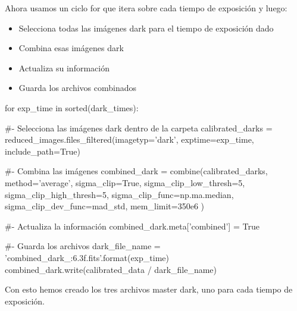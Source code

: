 Ahora usamos un ciclo for que itera sobre cada tiempo de exposición y luego:
\begin{itemize}
  \item Selecciona todas las imágenes dark para el tiempo de exposición dado
  \item Combina esas imágenes dark
  \item Actualiza su información
  \item Guarda los archivos combinados
\end{itemize}

\begin{pyin}
for exp_time in sorted(dark_times):

    #- Selecciona las imágenes dark dentro de la carpeta
    calibrated_darks = reduced_images.files_filtered(imagetyp='dark',
                                                     exptime=exp_time,
                                                     include_path=True)

    #- Combina las imágenes
    combined_dark = combine(calibrated_darks,
                            method='average',
                            sigma_clip=True, sigma_clip_low_thresh=5,
                            sigma_clip_high_thresh=5,
                            sigma_clip_func=np.ma.median, 
                            sigma_clip_dev_func=mad_std,
                            mem_limit=350e6
                            )

    #- Actualiza la información
    combined_dark.meta['combined'] = True

    #- Guarda los archivos
    dark_file_name = 'combined_dark_{:6.3f}.fits'.format(exp_time)
    combined_dark.write(calibrated_data / dark_file_name)
\end{pyin}

Con esto hemos creado los tres archivos master dark, uno para cada tiempo de exposición. 
